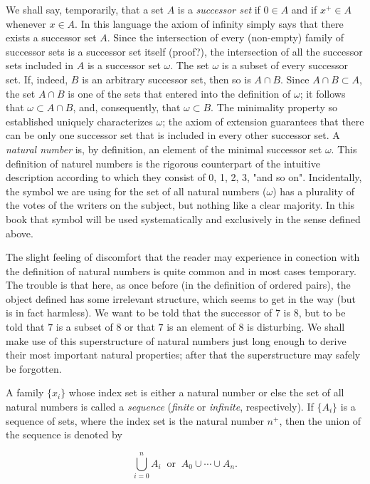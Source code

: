 We shall say, temporarily, that a set $A$ is a \textit{successor set} if $0 \in A$ and if $x^{+} \in A$ whenever $x \in A$. In this language the axiom of infinity simply says that there exists a successor set $A$. Since the intersection of every (non-empty) family of successor sets is a successor set itself (proof?), the intersection of all the successor sets included in $A$ is a successor set $ \omega $. The set $ \omega $ is a subset of every successor set. If, indeed, $B$ is an arbitrary successor set, then so is $A \cap B$. Since $ A \cap B \subset A$, the set $A \cap B$ is one of the sets that entered into the definition of $ \omega $; it follows that $ \omega \subset A \cap B$, and, consequently, that $\omega  \subset B$. The minimality property so established uniquely characterizes $ \omega $; the axiom of extension guarantees that there can be only one successor set that is included in every other successor set. A \textit{natural number} is, by definition, an element of the minimal successor set $ \omega$. This definition of naturel numbers is the rigorous counterpart of the intuitive description according to which they consist of 0, 1, 2, 3, "and so on". Incidentally, the symbol we are using for the set of all natural numbers ($ \omega $) has a plurality of the votes of the writers on the subject, but nothing like a clear majority. In this book that symbol will be used systematically and exclusively in the sense defined above.

The slight feeling of discomfort that the reader may experience in conection with the definition of natural numbers is quite common and in most cases temporary. The trouble is that here, as once before (in the definition of ordered pairs), the object defined has some irrelevant structure, which seems to get in the way (but is in fact harmless). We want to be told that the successor of $7$ is $8$, but to be told that $7$ is a subset of $8$ or that $7$ is an element of $8$ is disturbing. We shall make use of this superstructure of natural numbers just long enough to derive their most important natural properties; after that the superstructure may safely be forgotten.

A family $ \{ x_{i} \} $ whose index set is either a natural number or else the set of all natural numbers is called a \textit{sequence} (\textit{finite} or \textit{infinite}, respectively). If $\{ A_{i} \}$ is a sequence of sets, where the index set is the natural number $n^{+}$, then the union of the sequence is denoted by

\begin{equation*}
\bigcup_{i = 0}^{n} A_{i} \: \text{ or } \: A_{0}\cup \cdots \cup A_{n}.
\end{equation*}

